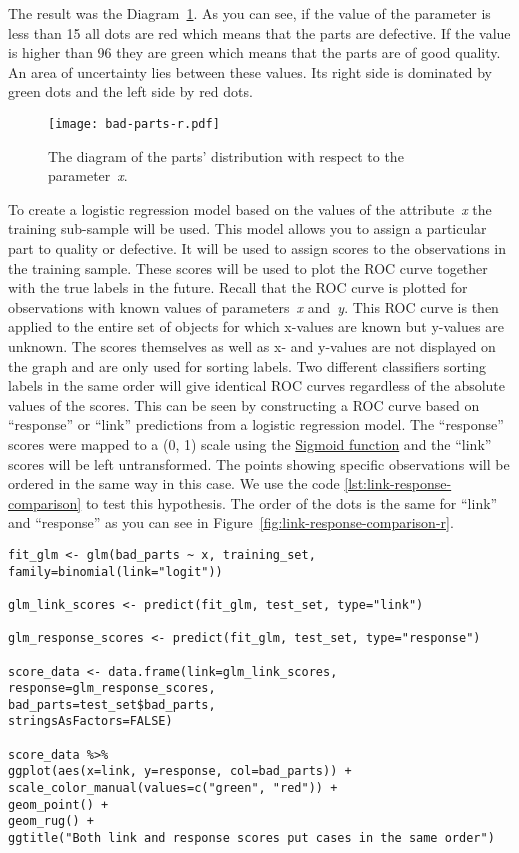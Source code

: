 \documentclass[]{scrreprt}
\begin{document}
The result was the Diagram~\ref{fig:bad-parts-r}. As you can see, if the value of the parameter is less than 15 all dots are red which means that the parts are defective. If the value is higher than 96 they are green which means that the parts are of good quality. An area of uncertainty lies between these values. Its right side is dominated by green dots and the left side by red dots. 
%
\begin{figure}[htp]
	\centering
	\texttt{[image: bad-parts-r.pdf]}
	\caption{The diagram of the parts' distribution with respect to the parameter~\textit{x}.}
	\label{fig:bad-parts-r}
\end{figure}

To create a logistic regression model based on the values of the attribute~\textit{x} the training sub-sample will be used. This model allows you to assign a particular part to quality or defective. It will be used to assign scores to the observations in the training sample. These scores will be used to plot the ROC curve together with the true labels in the future. Recall that the ROC curve is plotted for observations with known values of parameters~\textit{x} and~\textit{y}. This ROC curve is then applied to the entire set of objects for which x-values are known but y-values are unknown. The scores themselves as well as x- and y-values are not displayed on the graph and are only used for sorting labels. Two different classifiers sorting labels in the same order will give identical ROC curves regardless of the absolute values of the scores. This can be seen by constructing a ROC curve based on ``response'' or ``link'' predictions from a logistic regression model. The ``response'' scores were mapped to a (0, 1) scale using the \href{https://en.wikipedia.org/wiki/Sigmoid_function}{Sigmoid function}\cite{Wiki:sigmoid-function} and the ``link'' scores will be left untransformed. The points showing specific observations will be ordered in the same way in this case. We use the code \ref{lst:link-response-comparison} to test this hypothesis. The order of the dots is the same for ``link'' and ``response'' as you can see in Figure~\ref{fig:link-response-comparison-r}.
%
\begin{lstlisting}[float=htp, caption = Comparing "link" and "response" predictions, firstnumber=1, label= lst:link-response-comparison]
fit_glm <- glm(bad_parts ~ x, training_set, family=binomial(link="logit"))

glm_link_scores <- predict(fit_glm, test_set, type="link")

glm_response_scores <- predict(fit_glm, test_set, type="response")

score_data <- data.frame(link=glm_link_scores, 
response=glm_response_scores,
bad_parts=test_set$bad_parts,
stringsAsFactors=FALSE)

score_data %>% 
ggplot(aes(x=link, y=response, col=bad_parts)) + 
scale_color_manual(values=c("green", "red")) + 
geom_point() + 
geom_rug() + 
ggtitle("Both link and response scores put cases in the same order")

\end{lstlisting}
\end{document}
